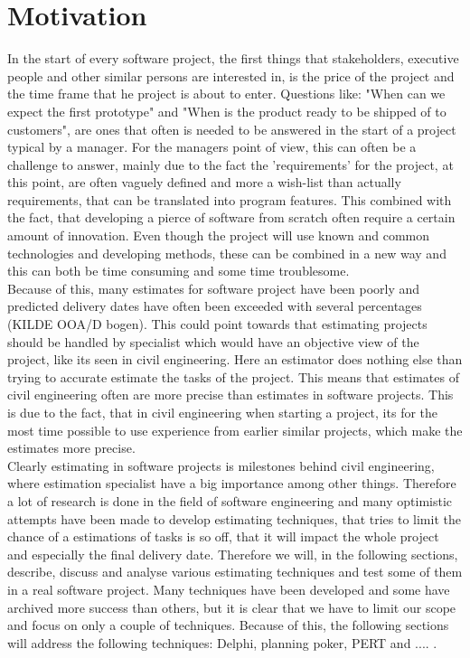 \section{Motivation}
In the start of every software project, the first things that stakeholders, executive people and other similar persons are interested in, is the price of the project and the time frame that he project is about to enter. Questions like: "When can we expect the first prototype" and "When is the product ready to be shipped of to customers", are ones that often is needed to be answered in the start of a project typical by a manager. For the managers point of view, this can often be a challenge to answer, mainly due to the fact the 'requirements' for the project, at this point, are often vaguely defined and more a wish-list than actually requirements, that can be translated into program features. This combined with the fact, that developing a pierce of software from scratch often require a certain amount of innovation. Even though the project  will use known and common technologies and developing methods, these can be combined in a new way and this can both be time consuming and some time troublesome. \\
Because of this, many estimates for software project have been poorly and predicted delivery dates have often been exceeded with several percentages (KILDE OOA/D bogen). This could point towards that estimating projects should be handled by specialist which would have an objective view of the project, like its seen in civil engineering. Here an estimator does nothing else than trying to accurate estimate the tasks of the project. This means that estimates of civil engineering often are more precise than estimates in software projects. This is due to the fact, that in civil engineering when starting a project, its for the most time possible to use experience from earlier similar projects, which make the estimates more precise. \\
Clearly estimating in software projects is milestones behind civil engineering, where estimation specialist have a big importance among other things. Therefore a lot of research is done in the field of software engineering and many optimistic attempts have been made to develop estimating techniques, that tries to limit the chance of a estimations of tasks is so off, that it will impact the whole project and especially the final delivery date. 
Therefore we will, in the following sections, describe, discuss and analyse various estimating techniques and test some of them in a real software project. Many techniques have been developed and some have archived more success than others, but it is clear that we have to limit our scope and focus on only a couple of techniques. Because of this, the following sections will address the following techniques: Delphi, planning poker, PERT and .... . \\
